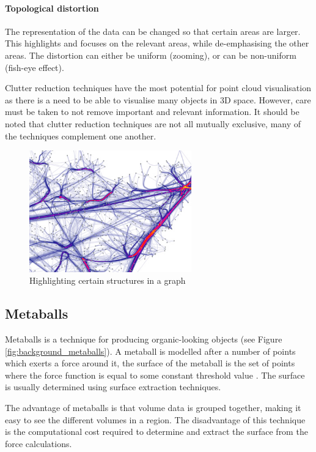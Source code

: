 \paragraph{Topological distortion} The representation of the data can be
changed so that certain areas are larger.  This highlights and focuses on the
relevant areas, while de-emphasising the other areas. The distortion can either
be uniform (zooming), or can be non-uniform (fish-eye effect).

Clutter reduction techniques have the most potential for point cloud
visualisation as there is a need to be able to visualise many objects in 3D
space. However, care must be taken to not remove important and relevant
information. It should be noted that clutter reduction techniques are not all
mutually exclusive, many of the techniques complement one another.

\begin{figure}[h!]
  \begin{center}
    \includegraphics[width=70mm]{graph_highlight}
  \end{center}
  \caption{Highlighting certain structures in a graph}
  \label{fig:background_highlight}
\end{figure}


\subsection{Metaballs}
\label{sub:background_metaballs}

Metaballs is a technique for producing organic-looking objects (see Figure
\ref{fig:background_metaballs}). A metaball is modelled after a number of
points which exerts a force around it, the surface of the metaball is the set
of points where the force function is equal to some constant threshold value
\citep{blinn82}. The surface is usually determined using surface extraction
techniques.

The advantage of metaballs is that volume data is grouped together, making it
easy to see the different volumes in a region. The disadvantage of this
technique is the computational cost required to determine and extract the
surface from the force calculations.

